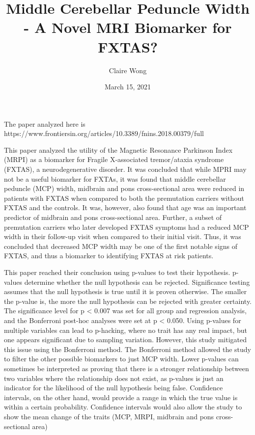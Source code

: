 \documentclass[a4paper, 11pt] {article}
\title{Middle Cerebellar Peduncle Width - A Novel MRI Biomarker for FXTAS?}
\author{Claire Wong}
\date{March 15, 2021}
\begin{document}
\maketitle
\begin{center}
    The paper analyzed here is https://www.frontiersin.org/articles/10.3389/fnins.2018.00379/full    
\end{center}

This paper analyzed the utility of the Magnetic Resonance Parkinson Index (MRPI) as a biomarker 
for Fragile X-associated tremor/ataxia syndrome (FXTAS), a neurodegenerative disorder. It was 
concluded that while MPRI may not be a useful biomarker for FXTAs, it was found that middle 
cerebellar peduncle (MCP) width, midbrain and pons cross-sectional area were reduced in patients 
with FXTAS when compared to both the premutation carriers without FXTAS and the controls. It was, 
however, also found that age was an important predictor of midbrain and pons cross-sectional area. 
Further, a subset of premutation carriers who later developed FXTAS symptoms had a reduced MCP width 
in their follow-up visit when compared to their initial visit. Thus, it was concluded that decreased 
MCP width may be one of the first notable signs of FXTAS, and thus a biomarker to identifying FXTAS 
at risk patients. 

This paper reached their conclusion using p-values to test their 
hypothesis. p-values determine whether the null hypothesis can be rejected. Significance testing 
assumes that the null hypothesis is true until it is proven otherwise. The smaller the p-value is, 
the more the null hypothesis can be rejected with greater certainty. The significance level for p < 
0.007 was set for all group and regression analysis, and the Bonferroni post-hoc analyses were set at 
p < 0.050. Using p-values for multiple variables can lead to p-hacking, where no trait has any real impact, 
but one appears significant due to sampling variation. However, this study mitigated this issue using the 
Bonferroni method. The Bonferroni method allowed the study to filter the other possible biomarkers to just 
MCP width. Lower p-values can sometimes be interpreted as proving that there is a stronger relationship 
between two variables where the relationship does not exist, as p-values is just an indicator for the likelihood 
of the null hypothesis being false. Confidence intervals, on the other hand, would provide a range in which 
the true value is within a certain probability. Confidence intervals would also allow the study to show the mean 
change of the traits (MCP, MRPI, midbrain and pons cross-sectional area)
\end{document}
